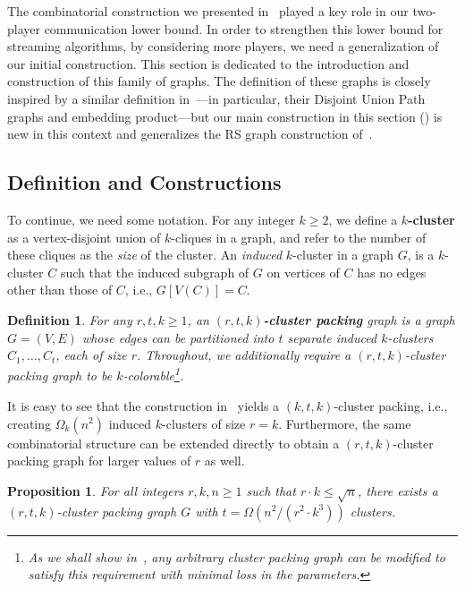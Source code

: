 \documentclass[11pt]{article}
\newtheorem{proposition}[lemma]{Proposition}
\newtheorem{definition}[lemma]{Definition}
\theoremstyle{definition}
\renewcommand{\leq}{\leqslant}
\renewcommand{\geq}{\geqslant}
\begin{document}
The combinatorial construction we presented in~ played a key role in our two-player communication lower bound. In order to strengthen this lower bound 
for streaming algorithms, by considering more players, we need a generalization of our initial construction. This section is dedicated to the introduction and construction of this family of graphs. 
The definition of these graphs is closely inspired by a similar definition in~\cite{AssadiKNS24}---in particular, their Disjoint Union Path graphs and embedding product---but our main construction in this section () is 
new in this context and generalizes the RS graph construction of~\cite{FischerLNRRS02}. 

\subsection{Definition and Constructions}\label{sec:cpg-definition}
To continue, we need some notation. For any integer $k \geq 2$, we define a \textbf{$k$-cluster} as a vertex-disjoint union of $k$-cliques in a graph, and refer to the number of these cliques as the \emph{size} of the cluster. An \emph{induced} $k$-cluster in a graph $G$, 
is a $k$-cluster $C$ such that the induced subgraph of $G$ on vertices of $C$ has no edges other than those of $C$, i.e., $G[V(C)] = C$. 

\begin{definition}\label{def:cpg}
	For any $r,t,k \geq 1$, an \textbf{$(r,t,k)$-cluster packing} graph is a graph $G=(V,E)$ whose edges can be partitioned into $t$ separate induced $k$-clusters $C_1,\ldots,C_t$, each of size $r$. 
	Throughout, we additionally require a $(r,t,k)$-cluster packing graph to be $k$-colorable\footnote{As we shall show in~, any arbitrary cluster packing graph can be modified to satisfy this requirement with minimal
	 loss in the parameters.}.	
\end{definition}

It is easy to see that the construction in~ yields a $(k, t, k)$-cluster packing, i.e., creating $\Omega_k(n^2)$ induced $k$-clusters of size $r=k$. 
Furthermore, the same combinatorial structure can be extended directly to obtain a $(r, t, k)$-cluster packing graph for larger values of $r$ as well. 

\begin{proposition}\label{prop:generalized-simple-graph}
	For all integers $r,k,n \geq 1$ such that $r \cdot k \leq \sqrt{n}$, there exists a $(r,t,k)$-cluster packing graph $G$ with $t = \Omega(n^2/(r^2 \cdot k^3))$ clusters. 
\end{proposition}
\end{document}
